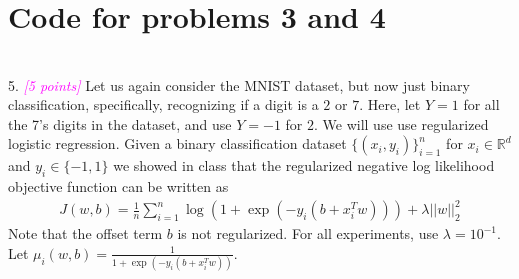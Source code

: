 \documentclass{article}
\newcommand{\field}[1]{\mathbb{#1}}
\newcommand{\1}{\mathbf{1}}
\newcommand{\R}{\field{R}} %
\newcommand{\grade}[1]{\small\textcolor{magenta}{\emph{[#1 points]}} \normalsize}
\begin{document}
\section*{Code for problems 3 and 4}














\section*{}
5. \grade{5} Let us again consider the MNIST dataset, but now just binary classification, specifically, recognizing if a digit is a $2$ or $7$.
Here, let $Y=1$ for all the 7's digits in the dataset, and use $Y=-1$ for $2$.
We will use use regularized logistic regression. 
Given a binary classification dataset $\{(x_i,y_i)\}_{i=1}^n$ for $x_i \in \R^d$ and $y_i \in \{-1,1\}$ we showed in class that the regularized negative log likelihood objective function can be written as
\begin{align*}
J(w,b) = \frac{1}{n} \sum_{i=1}^n \log( 1 + \exp(-y_i (b + x_i^T w))) + \lambda ||w||_2^2
\end{align*} 
Note that the offset term $b$ is not regularized. 
For all experiments, use $\lambda = 10^{-1}$. 
Let $\mu_i(w,b) = \frac{1}{1+ \exp(-y_i (b + x_i^T w))}$. 
\end{document}
